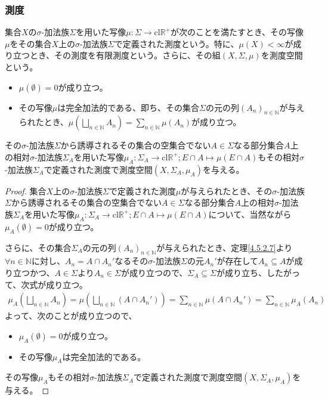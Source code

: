 \documentclass[dvipdfmx]{jsarticle}
\begin{document}
\subsubsection{測度}%
\begin{axs}[測度空間の公理]
集合$X$の$\sigma$-加法族$\varSigma$を用いた写像$\mu:\varSigma \rightarrow \mathrm{cl}\mathbb{R}^{+}$が次のことを満たすとき、その写像$\mu$をその集合$X$上の$\sigma$-加法族$\varSigma$で定義された測度という。特に、$\mu(X) < \infty$が成り立つとき、その測度を有限測度という。さらに、その組$(X,\varSigma,\mu)$を測度空間という。
\begin{itemize}
\item
  $\mu(\emptyset) = 0$が成り立つ。
\item
  その写像$\mu$は完全加法的である、即ち、その集合$\varSigma$の元の列$\left( A_{n} \right)_{n \in \mathbb{N}}$が与えられたとき、$\mu\left( \bigsqcup_{n \in \mathbb{N}} A_{n} \right) = \sum_{n \in \mathbb{N}} {\mu\left( A_{n} \right)}$が成り立つ。
\end{itemize}
\end{axs}
\begin{thm}\label{4.5.3.10}
その$\sigma$-加法族$\varSigma$から誘導されるその集合の空集合でない$A \in \varSigma$なる部分集合$A$上の相対$\sigma$-加法族$\varSigma_{A}$を用いた写像$\mu_{A}:\varSigma_{A} \rightarrow \mathrm{cl}\mathbb{R}^{+};E \cap A \mapsto \mu(E \cap A)$もその相対$\sigma$-加法族$\varSigma_{A}$で定義された測度で測度空間$\left( X,\varSigma_{A},\mu_{A} \right)$を与える。
\end{thm}
\begin{proof}
集合$X$上の$\sigma$-加法族$\varSigma$で定義された測度$\mu$が与えられたとき、その$\sigma$-加法族$\varSigma$から誘導されるその集合の空集合でない$A \in \varSigma$なる部分集合$A$上の相対$\sigma$-加法族$\varSigma_{A}$を用いた写像$\mu_{A}:\varSigma_{A} \rightarrow \mathrm{cl}\mathbb{R}^{+};E \cap A \mapsto \mu(E \cap A)$について、当然ながら$\mu_{A}(\emptyset) = 0$が成り立つ。\par
さらに、その集合$\varSigma_{A}$の元の列$\left( A_{n} \right)_{n \in \mathbb{N}}$が与えられたとき、定理\ref{4.5.2.7}より$\forall n \in \mathbb{N}$に対し、$A_{n} = A \cap A_{n}'$なるその$\sigma$-加法族$\varSigma$の元$A_{n}'$が存在して$A_{n} \subseteq A$が成り立つかつ、$A \in \varSigma$より$A_{n} \in \varSigma$が成り立つので、$\varSigma_{A} \subseteq \varSigma$が成り立ち、したがって、次式が成り立つ。
\begin{align*}
\mu_{A}\left( \bigsqcup_{n \in \mathbb{N}} A_{n} \right) = \mu\left( \bigsqcup_{n \in \mathbb{N}} \left( A \cap A_{n}' \right) \right) = \sum_{n \in \mathbb{N}} {\mu\left( A \cap A_{n}' \right)} = \sum_{n \in \mathbb{N}} {\mu_{A}\left( A_{n} \right)}
\end{align*}
よって、次のことが成り立つので、
\begin{itemize}
\item
  $\mu_{A}(\emptyset) = 0$が成り立つ。
\item
  その写像$\mu_{A}$は完全加法的である。
\end{itemize}
その写像$\mu_{A}$もその相対$\sigma$-加法族$\varSigma_{A}$で定義された測度で測度空間$\left( X,\varSigma_{A},\mu_{A} \right)$を与える。
\end{proof}
\end{document}
